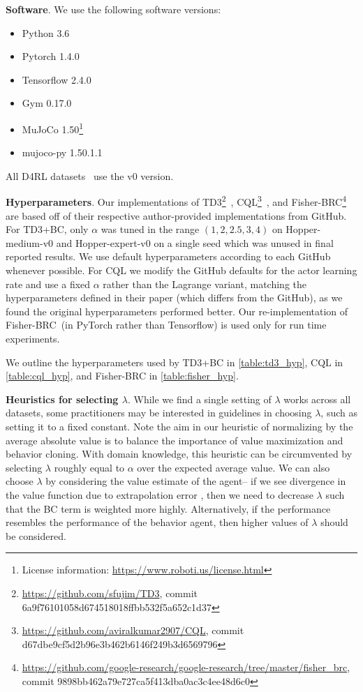 \documentclass{article}
\newcommand{\al}{\alpha}
\begin{document}
\textbf{Software}. We use the following software versions:
\begin{itemize}[nosep]
    \item Python 3.6
    \item Pytorch 1.4.0~\citep{paszke2019pytorch}
    \item Tensorflow 2.4.0~\citep{abadi2016tensorflow}
    \item Gym 0.17.0~\citep{OpenAIGym}
    \item MuJoCo 1.50\footnote{License information: \url{https://www.roboti.us/license.html}}~\citep{mujoco}%
    \item mujoco-py 1.50.1.1
\end{itemize}
All D4RL datasets~\citep{fu2021benchmarks} use the v0 version. 

\textbf{Hyperparameters}. Our implementations of TD3\footnote{\url{https://github.com/sfujim/TD3}, commit 6a9f76101058d674518018ffbb532f5a652c1d37}~\citep{fujimoto2018addressing}, CQL\footnote{\url{https://github.com/aviralkumar2907/CQL}, commit d67dbe9cf5d2b96e3b462b6146f249b3d6569796}~\citep{kumar2020conservative}, and Fisher-BRC\footnote{\url{https://github.com/google-research/google-research/tree/master/fisher_brc}, commit 9898bb462a79e727ca5f413dba0ac3c4ee48d6c0}~\citep{kostrikov2021offline} are based off of their respective author-provided implementations from GitHub. For TD3+BC, only $\al$ was tuned in the range $(1,2,2.5,3,4)$ on Hopper-medium-v0 and Hopper-expert-v0 on a single seed which was unused in final reported results. We use default hyperparameters according to each GitHub whenever possible. For CQL we modify the GitHub defaults for the actor learning rate and use a fixed $\alpha$ rather than the Lagrange variant, matching the hyperparameters defined in their paper (which differs from the GitHub), as we found the original hyperparameters performed better. Our re-implementation of Fisher-BRC~(in PyTorch rather than Tensorflow) is used only for run time experiments. 

We outline the hyperparameters used by TD3+BC in \autoref{table:td3_hyp}, CQL in \autoref{table:cql_hyp}, and Fisher-BRC in \autoref{table:fisher_hyp}. 

\textbf{Heuristics for selecting $\lambda$}. While we find a single setting of $\lambda$ works across all datasets, some practitioners may be interested in guidelines in choosing $\lambda$, such as setting it to a fixed constant. Note the aim in our heuristic of normalizing by the average absolute value is to balance the importance of value maximization and behavior cloning. With domain knowledge, this heuristic can be circumvented by selecting $\lambda$ roughly equal to $\al$ over the expected average value. We can also choose $\lambda$ by considering the value estimate of the agent-- if we see divergence in the value function due to extrapolation error \citep{fujimoto2018off}, then we need to decrease $\lambda$ such that the BC term is weighted more highly. Alternatively, if the performance resembles the performance of the behavior agent, then higher values of $\lambda$ should be considered.
\end{document}

